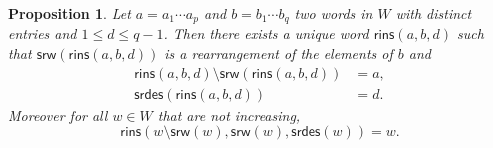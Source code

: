 \documentclass[a4paper]{amsart}
\newcommand{\des}{\mathsf{des}}
\newcommand{\srw}{\mathsf{srw}}
\newcommand{\rins}{\mathsf{rins}}
\newcommand{\srdes}{\mathsf{srdes}}
\newtheorem{proposition}[theorem]{Proposition}
\theoremstyle{definition}
\theoremstyle{remark}
\numberwithin{equation}{section}
\begin{document}
\begin{proposition}\label{prop:rinv}
Let $a=a_1\cdots a_p$ and $b=b_1\cdots b_q$ two words in $W$ with distinct entries and $1\leq d\leq q-1$. Then there exists a unique word $\rins(a,b,d)$ such that $\srw(\rins(a,b,d))$ is a rearrangement of the elements of $b$ and
\begin{align}\label{eq:rins1}
    \rins(a,b,d)\setminus\srw(\rins(a,b,d))&=a,\\
\srdes(\rins(a,b,d))&=d.\label{eq:rins2}
\end{align}
Moreover for all $w\in W$ that are not increasing,
\begin{equation}\label{eq:rins3}
    \rins(w\setminus\srw(w),\srw(w),\srdes(w))=w.
\end{equation}
\end{proposition}
\end{document}
